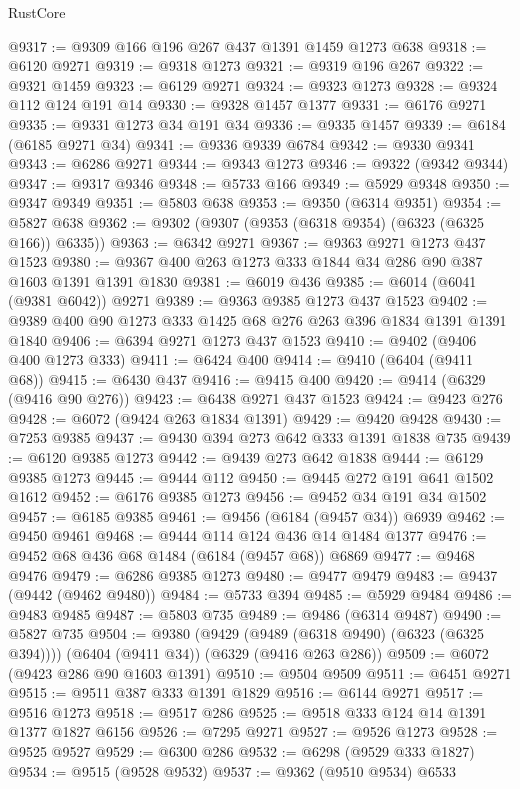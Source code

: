 \begin{lexlean}{RustCore}
\begin{coremodule}
{\begin{coremodule}
{{{{{{{{{{{{{{{{{{{{{{{{{{{{{{{{{{{{{{{{{{{{@9317 := @9309 @166 @196 @267 @437 @1391 @1459 @1273 @638
@9318 := @6120 @9271
@9319 := @9318 @1273
@9321 := @9319 @196 @267
@9322 := @9321 @1459
@9323 := @6129 @9271
@9324 := @9323 @1273
@9328 := @9324 @112 @124 @191 @14
@9330 := @9328 @1457 @1377
@9331 := @6176 @9271
@9335 := @9331 @1273 @34 @191 @34
@9336 := @9335 @1457
@9339 := @6184 (@6185 @9271 @34)
@9341 := @9336 @9339 @6784
@9342 := @9330 @9341
@9343 := @6286 @9271
@9344 := @9343 @1273
@9346 := @9322 (@9342 @9344)
@9347 := @9317 @9346
@9348 := @5733 @166
@9349 := @5929 @9348
@9350 := @9347 @9349
@9351 := @5803 @638
@9353 := @9350 (@6314 @9351)
@9354 := @5827 @638
@9362 := @9302 (@9307 (@9353 (@6318 @9354) (@6323 (@6325 @166)) @6335))
@9363 := @6342 @9271
@9367 := @9363 @9271 @1273 @437 @1523
@9380 := @9367 @400 @263 @1273 @333 @1844 @34 @286 @90 @387 @1603 @1391 @1391 @1830
@9381 := @6019 @436
@9385 := @6014 (@6041 (@9381 @6042)) @9271
@9389 := @9363 @9385 @1273 @437 @1523
@9402 := @9389 @400 @90 @1273 @333 @1425 @68 @276 @263 @396 @1834 @1391 @1391 @1840
@9406 := @6394 @9271 @1273 @437 @1523
@9410 := @9402 (@9406 @400 @1273 @333)
@9411 := @6424 @400
@9414 := @9410 (@6404 (@9411 @68))
@9415 := @6430 @437
@9416 := @9415 @400
@9420 := @9414 (@6329 (@9416 @90 @276))
@9423 := @6438 @9271 @437 @1523
@9424 := @9423 @276
@9428 := @6072 (@9424 @263 @1834 @1391)
@9429 := @9420 @9428
@9430 := @7253 @9385
@9437 := @9430 @394 @273 @642 @333 @1391 @1838 @735
@9439 := @6120 @9385 @1273
@9442 := @9439 @273 @642 @1838
@9444 := @6129 @9385 @1273
@9445 := @9444 @112
@9450 := @9445 @272 @191 @641 @1502 @1612
@9452 := @6176 @9385 @1273
@9456 := @9452 @34 @191 @34 @1502
@9457 := @6185 @9385
@9461 := @9456 (@6184 (@9457 @34)) @6939
@9462 := @9450 @9461
@9468 := @9444 @114 @124 @436 @14 @1484 @1377
@9476 := @9452 @68 @436 @68 @1484 (@6184 (@9457 @68)) @6869
@9477 := @9468 @9476
@9479 := @6286 @9385 @1273
@9480 := @9477 @9479
@9483 := @9437 (@9442 (@9462 @9480))
@9484 := @5733 @394
@9485 := @5929 @9484
@9486 := @9483 @9485
@9487 := @5803 @735
@9489 := @9486 (@6314 @9487)
@9490 := @5827 @735
@9504 := @9380
    (@9429 (@9489 (@6318 @9490) (@6323 (@6325 @394))))
    (@6404 (@9411 @34))
    (@6329 (@9416 @263 @286))
@9509 := @6072 (@9423 @286 @90 @1603 @1391)
@9510 := @9504 @9509
@9511 := @6451 @9271
@9515 := @9511 @387 @333 @1391 @1829
@9516 := @6144 @9271
@9517 := @9516 @1273
@9518 := @9517 @286
@9525 := @9518 @333 @124 @14 @1391 @1377 @1827 @6156
@9526 := @7295 @9271
@9527 := @9526 @1273
@9528 := @9525 @9527
@9529 := @6300 @286
@9532 := @6298 (@9529 @333 @1827)
@9534 := @9515 (@9528 @9532)
@9537 := @9362 (@9510 @9534) @6533
}}}}}}}}}}}}}}}}}}}}}}}}}}}}}}}}}}}}}}}}}}}}
\end{coremodule}}
\end{coremodule}
\end{lexlean}
